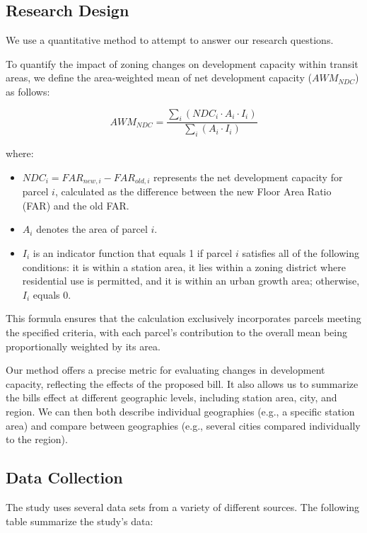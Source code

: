 \documentclass[
]{agujournal2019}
\providecommand{\tightlist}{%
  \setlength{\itemsep}{0pt}\setlength{\parskip}{0pt}}\usepackage{longtable,booktabs,array}
\begin{document}
\subsection{Research Design}\label{research-design}

We use a quantitative method to attempt to answer our research
questions.

To quantify the impact of zoning changes on development capacity within
transit areas, we define the area-weighted mean of net development
capacity (\(AWM_{NDC}\)) as follows:

\[
AWM_{NDC} = \frac{\sum_{i}(NDC_i \cdot A_i \cdot I_i)}{\sum_{i}(A_i \cdot I_i)}
\]

where:

\begin{itemize}
\tightlist
\item
  \(NDC_i = FAR_{new,i} - FAR_{old,i}\) represents the net development
  capacity for parcel \(i\), calculated as the difference between the
  new Floor Area Ratio (FAR) and the old FAR.
\item
  \(A_i\) denotes the area of parcel \(i\).
\item
  \(I_i\) is an indicator function that equals 1 if parcel \(i\)
  satisfies all of the following conditions: it is within a station
  area, it lies within a zoning district where residential use is
  permitted, and it is within an urban growth area; otherwise, \(I_i\)
  equals 0.
\end{itemize}

This formula ensures that the calculation exclusively incorporates
parcels meeting the specified criteria, with each parcel's contribution
to the overall mean being proportionally weighted by its area.

Our method offers a precise metric for evaluating changes in development
capacity, reflecting the effects of the proposed bill. It also allows us
to summarize the bills effect at different geographic levels, including
station area, city, and region. We can then both describe individual
geographies (e.g., a specific station area) and compare between
geographies (e.g., several cities compared individually to the region).

\subsection{Data Collection}\label{data-collection}

The study uses several data sets from a variety of different sources.
The following table summarize the study's data:
\end{document}
